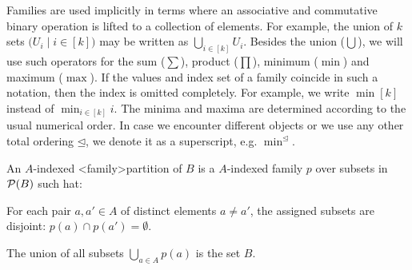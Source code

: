 \documentclass[../document.tex]{subfiles}
\begin{document}
    Families are used implicitly in terms where an associative and commutative binary operation is lifted to a collection of elements.
    For example, the union of \(k\) sets \(\big(U_i \mid i \in [k]\big)\) may be written as \(\bigcup_{i \in [k]} U_i\).
    Besides the union (\(\bigcup\)), we will use such operators for the sum (\(\sum\)), product (\(\prod\)), minimum (\(\min\)) and maximum (\(\max\)).
    If the values and index set of a family coincide in such a notation, then the index is omitted completely.
    For example, we write \(\min [k]\) instead of \(\min_{i \in [k]} i\).
    The minima and maxima are determined according to the usual numerical order.
    In case we encounter different objects or we use any other total ordering \(\unlhd\), we denote it as a superscript, e.g. \(\min^{\unlhd}\).

    An \(A\)-indexed <family>{partition} of \(B\) is a \(A\)-indexed family \(p\) over subsets in \(\mathcal{P}(B)\) such hat:
    \begin{inparaenum}[(i)]
        \item For each pair \(a, a' \in A\) of distinct elements \(a \neq a'\), the assigned subsets are disjoint: \(p(a) \cap p(a') = \emptyset\).
        \item The union of all subsets \(\bigcup_{a \in A} p(a)\) is the set \(B\).
    \end{inparaenum}
\end{document}
